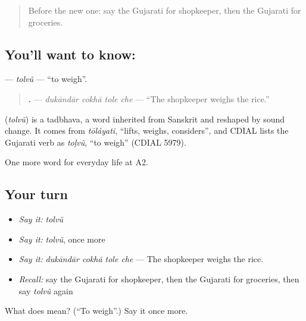 \label{lesson:GU-C183-tolvu}



\begin{quote}
Before the new one: say the Gujarati for shopkeeper, then the Gujarati for groceries.
\end{quote}

\subsection*{You'll want to know: }
\textbf{} — \emph{tolvũ} — \textquotedblleft{}to weigh\textquotedblright{}.

\begin{quote}
\textbf{   .} — \emph{dukāndār cokhā tole che} — \textquotedblleft{}The shopkeeper weighs the rice.\textquotedblright{}
\end{quote}

\begin{cousinweb}
\textbf{} (\emph{tolvũ}) is a tadbhava, a word inherited from Sanskrit and reshaped by sound change. It comes from \emph{tōláyati}, \textquotedblleft{}lifts, weighs, considers\textquotedblright{}, and CDIAL lists the Gujarati verb as \emph{toḷvũ}, \textquotedblleft{}to weigh\textquotedblright{} (CDIAL 5979).
\end{cousinweb}

\begin{grammarlens}[title={What you've built}]
One more word for everyday life at A2.
\end{grammarlens}

\subsection*{Your turn}
\begin{itemize}
\raggedright
  \item \emph{Say it:} \emph{tolvũ}
  \item \emph{Say it:} \emph{tolvũ}, once more
  \item \emph{Say it:} \emph{dukāndār cokhā tole che} — The shopkeeper weighs the rice.
  \item \emph{Recall:} say the Gujarati for shopkeeper, then the Gujarati for groceries, then say \emph{tolvũ} again
\end{itemize}

\begin{tcolorbox}[breakable,colback=teal!4,colframe=teal!35!black,title={Before you move on}]
What does  mean? (\textquotedblleft{}To weigh\textquotedblright{}.) Say it once more.
\end{tcolorbox}

